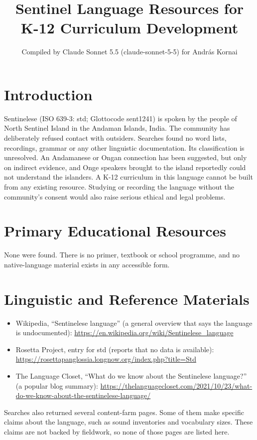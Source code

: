\documentclass[12pt]{article}
\title{Sentinel Language Resources for K-12 Curriculum Development}
\author{Compiled by Claude Sonnet 5.5 (claude-sonnet-5-5) for Andr\'as Kornai}
\date{}
\begin{document}
\maketitle

\section{Introduction}
Sentinelese (ISO 639-3: std; Glottocode sent1241) is spoken by the people of North Sentinel Island in the Andaman Islands, India. The community has deliberately refused contact with outsiders. Searches found no word lists, recordings, grammar or any other linguistic documentation. Its classification is unresolved. An Andamanese or Ongan connection has been suggested, but only on indirect evidence, and Onge speakers brought to the island reportedly could not understand the islanders. A K-12 curriculum in this language cannot be built from any existing resource. Studying or recording the language without the community's consent would also raise serious ethical and legal problems.

\section{Primary Educational Resources}
None were found. There is no primer, textbook or school programme, and no native-language material exists in any accessible form.

\section{Linguistic and Reference Materials}
\begin{itemize}
\item Wikipedia, ``Sentinelese language'' (a general overview that says the language is undocumented): \url{https://en.wikipedia.org/wiki/Sentinelese_language}
\item Rosetta Project, entry for std (reports that no data is available): \url{https://rosettapanglossia.longnow.org/index.php?title=Std}
\item The Language Closet, ``What do we know about the Sentinelese language?'' (a popular blog summary): \url{https://thelanguagecloset.com/2021/10/23/what-do-we-know-about-the-sentinelese-language/}
\end{itemize}
Searches also returned several content-farm pages. Some of them make specific claims about the language, such as sound inventories and vocabulary sizes. These claims are not backed by fieldwork, so none of those pages are listed here.
\end{document}

